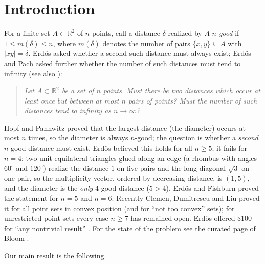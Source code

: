 \documentclass[11pt]{article}
\theoremstyle{definition}
\theoremstyle{remark}
\newcommand{\R}{\mathbb{R}}
\begin{document}
\section{Introduction}\label{sec:intro}

For a finite set $A \subset \R^2$ of $n$ points, call a distance $\delta$ realized by $A$
\emph{$n$-good} if $1 \le m(\delta) \le n$, where $m(\delta)$ denotes the number of pairs
$\{x,y\} \subseteq A$ with $|xy| = \delta$. Erd\H{o}s \cite{Er84c} asked whether a
second such distance must always exist; Erd\H{o}s and Pach \cite{ErPa90} asked further
whether the number of such distances must tend to infinity
(see also \cite{ErFi95,Bloom132}):

\begin{quote}
\emph{Let $A \subset \R^2$ be a set of $n$ points. Must there be two distances which occur
at least once but between at most $n$ pairs of points? Must the number of such distances
tend to infinity as $n \to \infty$?}
\end{quote}

Hopf and Pannwitz \cite{HoPa34} proved that the largest distance (the diameter) occurs at
most $n$ times, so the diameter is always $n$-good; the question is whether a
\emph{second} $n$-good distance must exist. Erd\H{o}s \cite{Er84c} believed this holds for
all $n \ge 5$; it fails for $n = 4$: two unit equilateral triangles glued along an edge (a
rhombus with angles $60^\circ$ and $120^\circ$) realize the distance $1$ on five pairs
and the long diagonal $\sqrt{3}$ on one pair, so the multiplicity vector, ordered by
decreasing distance, is $(1,5)$, and the diameter is the \emph{only} $4$-good distance
($5 > 4$). Erd\H{o}s and Fishburn \cite{ErFi95} proved the statement for $n = 5$ and
$n = 6$. Recently Clemen, Dumitrescu and Liu \cite{CDL25} proved it for all point sets in
convex position (and for ``not too convex'' sets); for unrestricted point sets every case
$n \ge 7$ has remained open. Erd\H{o}s offered \$100 for ``any nontrivial result''
\cite{Er97e}. For the state of the problem see the curated page of Bloom \cite{Bloom132}.

Our main result is the following.
\end{document}
